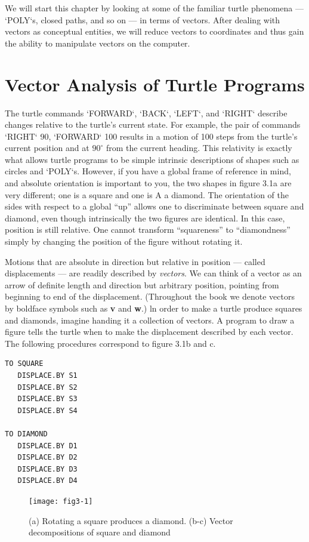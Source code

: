 \documentclass{book}
\begin{document}
We will start this chapter by looking at some of the familiar turtle
phenomena --- \textsc{`POLY`}s, closed paths, and so on --- in terms of vectors. After
dealing with vectors as conceptual entities, we will reduce vectors to
coordinates and thus gain the ability to manipulate vectors on the computer.

\section{Vector Analysis of Turtle Programs}

The turtle commands \textsc{`FORWARD`}, \textsc{`BACK`}, \textsc{`LEFT`}, and \textsc{`RIGHT`} describe changes
relative to the turtle's current state. For example, the pair of commands
\textsc{`RIGHT`} 90, \textsc{`FORWARD`} 100 results in a motion of 100 steps from the turtle's
current position and at $90^{\circ}$ from the current heading. This relativity is
exactly what allows turtle programs to be simple intrinsic descriptions
of shapes such as circles and \textsc{`POLY`}s. However, if you have a global frame
of reference in mind, and absolute orientation is important to you, the
two shapes in figure 3.1a are very different; one is a square and one is
A a diamond. The orientation of the sides with respect to a global ``up''
allows one to discriminate between square and diamond, even though
intrinsically the two figures are identical. In this case, position is still
relative. One cannot transform ``squareness'' to ``diamondness'' simply
by changing the position of the figure without rotating it.

Motions that are absolute in direction but relative in position --- called
displacements --- are readily described by {\em vectors}. We can think of a
vector as an arrow of definite length and direction but arbitrary position,
pointing from beginning to end of the displacement. (Throughout the
book we denote vectors by boldface symbols such as \textbf{v} and \textbf{w}.) ln order
to make a turtle produce squares and diamonds, imagine handing it
a collection of vectors. A program to draw a figure tells the turtle
when to make the displacement described by each vector. The following
procedures correspond to figure 3.1b and c.

\begin{verbatim}
TO SQUARE
   DISPLACE.BY S1
   DISPLACE.BY S2
   DISPLACE.BY S3
   DISPLACE.BY S4

TO DIAMOND
   DISPLACE.BY D1
   DISPLACE.BY D2
   DISPLACE.BY D3
   DISPLACE.BY D4
\end{verbatim}
\begin{figure}
\begin{center}
\texttt{[image: fig3-1]}
\caption{(a) Rotating a square produces a diamond. (b-c) Vector decompositions of square and diamond}
\end{center}
\end{figure}
\end{document}
